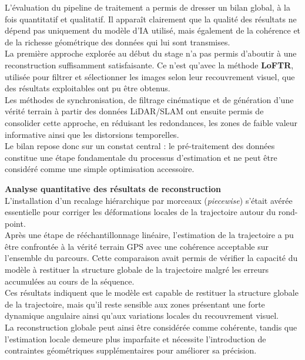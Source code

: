 \documentclass[12pt,a4paper,oneside]{report}
\begin{document}
\hspace*{0.3cm}L'évaluation du pipeline de traitement a permis de dresser un bilan global, à la fois quantitatif et qualitatif. Il apparaît clairement que la qualité des résultats ne dépend pas uniquement du modèle d'IA utilisé, mais également de la cohérence et de la richesse géométrique des données qui lui sont transmises.\\
\hspace*{.3cm}La première approche explorée au début du stage n'a pas permis d'aboutir à une reconstruction suffisamment satisfaisante. Ce n'est qu'avec la méthode \textbf{LoFTR}, utilisée pour filtrer et sélectionner les images selon leur recouvrement visuel, que des résultats exploitables ont pu être obtenus.\\
\hspace*{.3cm}Les méthodes de synchronisation, de filtrage cinématique et de génération d'une vérité terrain à partir des données LiDAR/SLAM ont ensuite permis de consolider cette approche, en réduisant les redondances, les zones de faible valeur informative ainsi que les distorsions temporelles.\\

\hspace*{.3cm}Le bilan repose donc sur un constat central : le pré-traitement des données constitue une étape fondamentale du processus d'estimation et ne peut être considéré comme une simple optimisation accessoire.

\par\bigskip
\par\bigskip

\hspace*{0.4cm}\textbf{Analyse quantitative des résultats de reconstruction}\\

\hspace*{.3cm}L'installation d'un recalage hiérarchique par morceaux (\textit{piecewise}) s'était avérée essentielle pour corriger les déformations locales de la trajectoire autour du rond-point.\\
Après une étape de rééchantillonnage linéaire, l'estimation de la trajectoire a pu être confrontée à la vérité terrain GPS avec une cohérence acceptable sur l'ensemble du parcours. Cette comparaison avait permis de vérifier la capacité du modèle à restituer la structure globale de la trajectoire malgré les erreurs accumulées au cours de la séquence.\\

\hspace*{.3cm}Ces résultats indiquent que le modèle est capable de restituer la structure globale de la trajectoire, mais qu'il reste sensible aux zones présentant une forte dynamique angulaire ainsi qu'aux variations locales du recouvrement visuel.\\
\hspace*{.3cm}La reconstruction globale peut ainsi être considérée comme cohérente, tandis que l'estimation locale demeure plus imparfaite et nécessite l'introduction de contraintes géométriques supplémentaires pour améliorer sa précision.
\end{document}
